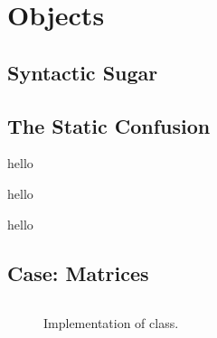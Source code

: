 \chapter{Objects}




\section{Syntactic Sugar}



\section{The Static Confusion}



\csharpsection{\csharp}
hello

hello

hello


\section{Case: Matrices}







\csharpsubsection{\csharp}

\begin{figure}[tbp]
  \inputminted[fontsize=\footnotesize]{csharp}{../src/csharp/matrix/Matrix.cs}
  \caption{Implementation of  class.}
  \label{fig:objects:matrix:lib}
\end{figure}

